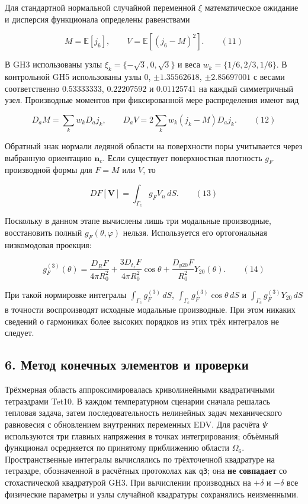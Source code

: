 \documentclass[
]{article}
\begin{document}
Для стандартной нормальной случайной переменной \(\xi\) математическое
ожидание и дисперсия функционала определены равенствами

\[
M=\mathbb E[j_6],\qquad V=\mathbb E[(j_6-M)^2]. \qquad(11)
\]

В GH3 использованы узлы \(\xi_k=\{-\sqrt3,0,\sqrt3\}\) и веса
\(w_k=\{1/6,2/3,1/6\}\). В контрольной GH5 использованы узлы \(0\),
\(\pm1.35562618\), \(\pm2.85697001\) с весами соответственно
\(0.53333333\), \(0.22207592\) и \(0.01125741\) на каждый симметричный
узел. Производные моментов при фиксированной мере распределения имеют
вид

\[
D_aM=\sum_kw_kD_aj_k,\qquad
D_aV=2\sum_kw_k(j_k-M)D_aj_k. \qquad(12)
\]

Обратный знак нормали ледяной области на поверхности поры учитывается
через выбранную ориентацию \(\boldsymbol n_c\). Если существует
поверхностная плотность \(g_F\) производной формы для \(F=M\) или \(V\),
то

\[
D F[\boldsymbol V]=\int_{\Gamma_c}g_F V_n\,dS. \qquad(13)
\]

Поскольку в данном этапе вычислены лишь три модальные производные,
восстановить полный \(g_F(\theta,\varphi)\) нельзя. Используется его
ортогональная низкомодовая проекция:

\[
g_F^{(3)}(\theta)=\frac{D_RF}{4\pi R_0^2}
+\frac{3D_{t_z}F}{4\pi R_0^2}\cos\theta
+\frac{D_{y20}F}{R_0^2}Y_{20}(\theta). \qquad(14)
\]

При такой нормировке интегралы \(\int_{\Gamma_c}g_F^{(3)}\,dS\),
\(\int_{\Gamma_c}g_F^{(3)}\cos\theta\,dS\) и
\(\int_{\Gamma_c}g_F^{(3)}Y_{20}\,dS\) в точности воспроизводят исходные
модальные производные. При этом никаких сведений о гармониках более
высоких порядков из этих трёх интегралов не следует.

\subsection{6. Метод конечных элементов и
проверки}\label{ux43cux435ux442ux43eux434-ux43aux43eux43dux435ux447ux43dux44bux445-ux44dux43bux435ux43cux435ux43dux442ux43eux432-ux438-ux43fux440ux43eux432ux435ux440ux43aux438}

Трёхмерная область аппроксимировалась криволинейными квадратичными
тетраэдрами Tet10. В каждом температурном сценарии сначала решалась
тепловая задача, затем последовательность нелинейных задач механического
равновесия с обновлением внутренних переменных EDV. Для расчёта \(\Psi\)
используются три главных напряжения в точках интегрирования; объёмный
функционал осредняется по принятому приближению области \(\Omega_6\).
Пространственные интегралы вычислялись по трёхточечной квадратуре на
тетраэдре, обозначенной в расчётных протоколах как \texttt{q3}; она
\textbf{не совпадает} со стохастической квадратурой GH3. При вычислении
производных на \(+\delta\) и \(-\delta\) все физические параметры и узлы
случайной квадратуры сохранялись неизменными.
\end{document}
